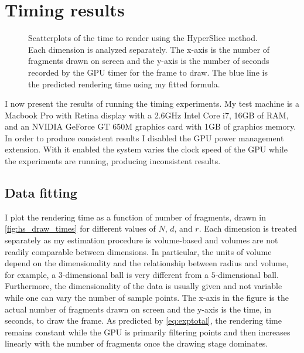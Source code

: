 \section{Timing results}
\label{sec:timingresults}

\begin{figure*}[t]
  \centering
  
  \caption[Scatterplots of the time to render using the HyperSlice method.]{%
    Scatterplots of the time to render using the HyperSlice method.
    Each dimension is analyzed separately.  The x-axis is the number of
    fragments drawn on screen and the y-axis is the number of seconds
    recorded by the GPU timer for the frame to draw.
    The blue line is the predicted rendering time using my fitted 
    formula. 
  }
  \label{fig:hs_draw_times}
\end{figure*}

I now present the results of running the timing experiments.  My test
machine is a Macbook Pro with Retina display with a 2.6GHz Intel Core i7, 16GB
of RAM, and an NVIDIA GeForce GT 650M graphics card with 1GB of graphics
memory.  In order to produce consistent results I disabled the GPU power
management extension.  With it enabled the system varies the clock speed of
the GPU while the experiments are running, producing inconsistent results.

\subsection{Data fitting}
\label{sec:datafitting}

I plot the rendering time as a function of number of fragments,
drawn in \autoref{fig:hs_draw_times} for different values of $N$, $d$, and $r$. 
Each dimension is treated separately as my estimation procedure is volume-based
and volumes are not readily comparable between dimensions.  
In particular, the units of volume depend on the dimensionality and the 
relationship between radius and volume,
for example, a $3$-dimensional ball is very different from a
$5$-dimensional ball.
Furthermore, the dimensionality of the data is usually given and not 
variable while one can vary the number of sample points.
The x-axis in the figure is
the actual number of fragments drawn on screen and the y-axis is the 
time, in seconds, to draw the frame.  As predicted by \autoref{eq:exptotal},
the rendering time remains constant while the GPU is primarily filtering 
points and then increases linearly with the number of fragments once the 
drawing stage dominates.

